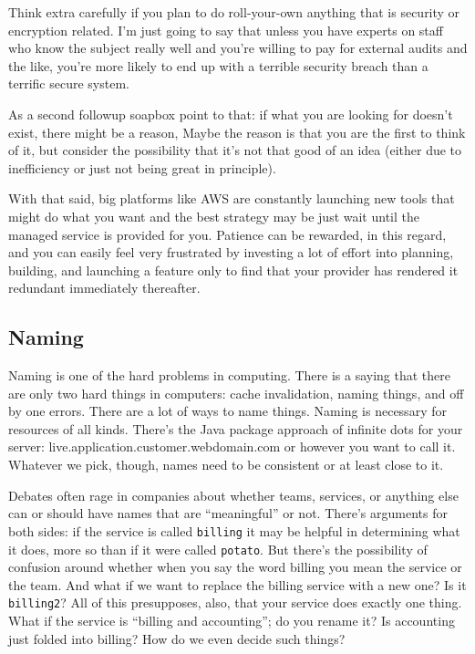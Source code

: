 Think extra carefully if you plan to do roll-your-own anything that is security or encryption related. I'm just going to say that unless you have experts on staff who know the subject really well and you're willing to pay for external audits and the like, you're more likely to end up with a terrible security breach than a terrific secure system. 

As a second followup soapbox point to that: if what you are looking for doesn't exist, there might be a reason, Maybe the reason is that you are the first to think of it, but consider the possibility that it's not that good of an idea (either due to inefficiency or just not being great in principle). 

With that said, big platforms like AWS are constantly launching new tools that might do what you want and the best strategy may be just wait until the managed service is provided for you. Patience can be rewarded, in this regard, and you can easily feel very frustrated by investing a lot of effort into planning, building, and launching a feature only to find that your provider has rendered it redundant immediately thereafter.

\subsection*{Naming}
Naming is one of the hard problems in computing. There is a saying that there are only two hard things in computers: cache invalidation, naming things, and off by one errors.  There are a
lot of ways to name things. Naming is necessary for resources of all kinds. There's the Java package approach of infinite dots for your server: live.application.customer.webdomain.com or however you want to call it. Whatever we pick, though, names need to be consistent or at least close to it.

Debates often rage in companies about whether teams, services, or anything else can or should have names that are ``meaningful'' or not. There's arguments for both sides: if the service is called \texttt{billing} it may be helpful in determining what it does, more so than if it were called \texttt{potato}. But there's the possibility of confusion around whether when you say the word billing you mean the service or the team. And what if we want to replace the billing service with a new one? Is it \texttt{billing2}? All of this presupposes, also, that your service does exactly one thing. What if the service is ``billing and accounting''; do you rename it? Is accounting just folded into billing? How do we even decide such things? 

